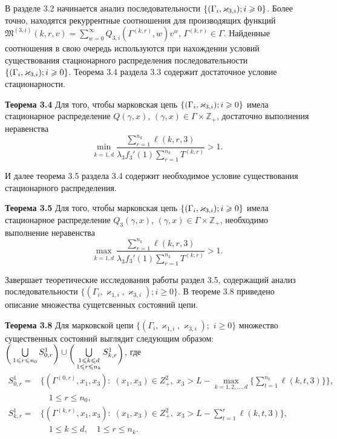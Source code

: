 \documentclass[14pt]{extarticle}
\theoremstyle{theorem}
\theoremstyle{remark}
\renewcommand*{\hm}[1]{#1\nobreak\discretionary{}%
	{\hbox{$\mathsurround=0pt #1$}}{}}%
\newcommand{\MarkThree}{\{(\Gamma_i, \varkappa_{3,i}); \hm{} i \geqslant 0\}}
\begin{document}
В разделе 3.2 начинается анализ последовательности $\MarkThree$. Более точно, находятся рекуррентные соотношения для производящих функций $
\mathfrak{M}^{(3,i)}(k,r,v) = \sum_{w=0}^{\infty} Q_{3,i}(\Gamma^{(k,r)},w) v^w
$, $\Gamma^{(k,r)}\in \Gamma$. 
Найденные соотношения в свою очередь используются при нахождении условий существования стационарного распределения последовательности $\MarkThree$. Теорема 3.4 раздела 3.3 содержит достаточное условие стационарности.

 {\bf Теорема 3.4}
{ 
Для того, чтобы марковская цепь $\MarkThree$ имела стационарное распределение $Q(\gamma,x)$, $(\gamma,x)\in \Gamma \times {\mathbb Z}_+$, достаточно выполнения неравенства 
\begin{equation*}
\min_{k=\overline{1,d}} { \frac{\sum_{r = 1}^{n_k} \ell(k,r,3) }{\lambda_3 f_3'(1) \sum_{r=1}^{n_k} T^{(k,r)} }}>1.
\label{sufficient:low}
\end{equation*}
}

И далее теорема 3.5 раздела 3.4 содержит необходимое условие существования стационарного распределения.

 {\bf Теорема 3.5}
{
Для того, чтобы марковская цепь $\MarkThree$ имела стационарное распределение $Q_3(\gamma,x)$, $(\gamma,x)\in \Gamma \times {\mathbb Z}_+$, необходимо выполнение неравенства
$$
\max_{k=\overline{1,d}} { \frac{\sum_{r = 1}^{n_{k}}\ell(k,r,3)}{\lambda_3 f_3'(1) \sum_{r = 1}^{n_k} T^{(k,r)}} } >1.
$$
}

Завершает теоретические исследования работы раздел 3.5, содержащий анализ последовательности $\{(\Gamma_i, \varkappa_{1,i},\varkappa_{3,i}); i \geqslant 0\}$. В теореме 3.8 приведено описание множества сущетсвенных состояний цепи.


{\bf Теорема 3.8}
Для марковской цепи $\{(\Gamma_i, \varkappa_{1,i},\varkappa_{3,i});$ $i \geqslant 0\}$ множество существенных состояний  выглядит следующим образом:  $\raisebox{-.5ex}{$\biggl($}\bigcup\limits_{1 \leqslant r \leqslant n_0}S^1_{0,r}\raisebox{-.5ex}{$\biggr)$}\cup \raisebox{-.5ex}{$\biggl($}\bigcup\limits_{\substack{1 \leqslant k \leqslant d\\ 1 \leqslant r \leqslant n_k}} S^1_{k,r}\raisebox{-.5ex}{$\biggr)$}$,
где
\begin{align*}
  S^1_{0,r} = & 
  \biggl\{
  (\Gamma^{(0,r)},x_1, x_3) \colon \; (x_1, x_3)\in Z^2_+,\; x_3 > L - \max\limits_{k=1, 2,
    \ldots, d}
  \biggl\{ \sum_{t=1}^{n_k} \ell({k,t,3}) \biggl\}\biggl\}, 
  \\ & \quad 1 \leqslant r \leqslant n_0, \\
  S^1_{k,r} = & 
  \biggl\{
  (\Gamma^{(k,r)},x_1, x_3) \colon \; (x_1, x_3)\in Z^2_+,\; x_3 > L - \sum_{t=1}^{r} \ell({k,t,3})
  \biggr\}, \\
  &\quad  1 \leqslant k \leqslant d, \quad 1 \leqslant r \leqslant n_k.
\end{align*}
\end{document}
